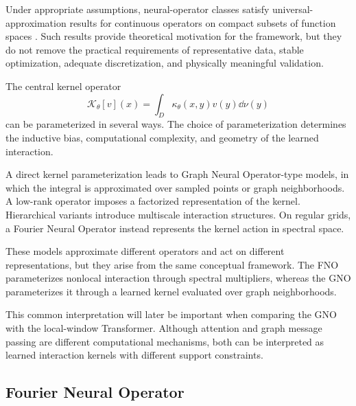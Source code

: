 Under appropriate assumptions, neural-operator classes satisfy universal-approximation results for continuous operators on compact subsets of function spaces \cite{kovachki_neural_2023}. Such results provide theoretical motivation for the framework, but they do not remove the practical requirements of representative data, stable optimization, adequate discretization, and physically meaningful validation.


The central kernel operator
\begin{equation}
\mathcal{K}_{\theta}[v](x)
=
\int_D
\kappa_{\theta}(x,y)
v(y)
\dd\nu(y)
\end{equation}
can be parameterized in several ways. The choice of parameterization determines the inductive bias, computational complexity, and geometry of the learned interaction.

A direct kernel parameterization leads to Graph Neural Operator-type models, in which the integral is approximated over sampled points or graph neighborhoods. A low-rank operator imposes a factorized representation of the kernel. Hierarchical variants introduce multiscale interaction structures. On regular grids, a Fourier Neural Operator instead represents the kernel action in spectral space.

These models approximate different operators and act on different representations, but they arise from the same conceptual framework. The FNO parameterizes nonlocal interaction through spectral multipliers, whereas the GNO parameterizes it through a learned kernel evaluated over graph neighborhoods.

This common interpretation will later be important when comparing the GNO with the local-window Transformer. Although attention and graph message passing are different computational mechanisms, both can be interpreted as learned interaction kernels with different support constraints.

\subsection{Fourier Neural Operator}
\label{subsec:fourier_neural_operator}

